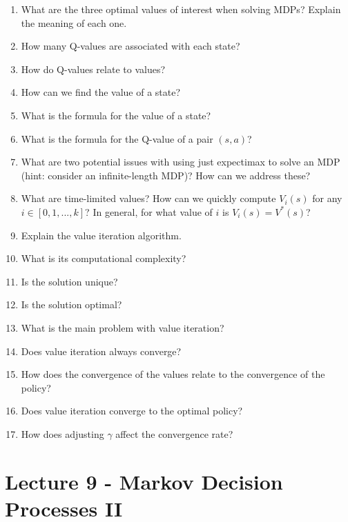 \documentclass[]{article}
\begin{document}
\begin{enumerate}
\item What are the three optimal values of interest when solving MDPs? Explain the meaning of each one. \\
\item How many Q-values are associated with each state?
\item How do Q-values relate to values?
\item How can we find the value of a state?
\item What is the formula for the value of a state?
\item What is the formula for the Q-value of a pair $(s,a)$?
\item What are two potential issues with using just expectimax to solve an MDP (hint: consider an infinite-length MDP)? How can we address these? \\
\item What are time-limited values? How can we quickly compute $V_{i}(s)$ for any $i \in [0,1,...,k]$? In general, for what value of $i$ is $V_{i}(s) = V^{*}(s)$? \\
\item Explain the value iteration algorithm.
\item What is its computational complexity?
\item Is the solution unique?
\item Is the solution optimal?
\item What is the main problem with value iteration?
\item Does value iteration always converge?
\item How does the convergence of the values relate to the convergence of the policy?
\item Does value iteration converge to the optimal policy?
\item How does adjusting $\gamma$ affect the convergence rate? \\
\end{enumerate}

\section*{Lecture 9 - Markov Decision Processes II}
\end{document}
